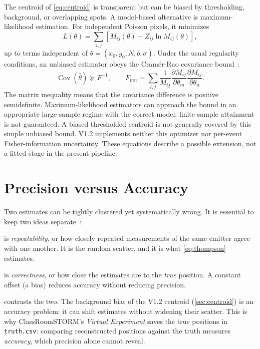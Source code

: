 \documentclass[11pt,a4paper]{article}
\newcommand{\file}[1]{\texttt{#1}}
\newcommand{\app}{ClassRoomSTORM}
\begin{document}
\begin{csideal}
The centroid of \cref{eq:centroid} is transparent but can be biased by
thresholding, background, or overlapping spots. A model-based alternative is
maximum-likelihood estimation. For independent Poisson pixels, it minimizes
\begin{equation}
  L(\theta)=\sum_{i,j}[M_{ij}(\theta)-Z_{ij}\ln M_{ij}(\theta)],
  \label{eq:nll}
\end{equation}
up to terms independent of $\theta=(x_0,y_0,N,b,\sigma)$. Under the usual
regularity conditions, an unbiased estimator obeys the Cram\'er-Rao covariance
bound~\cite{ober2004,mortensen2010}:
\begin{equation}
  \operatorname{Cov}(\hat\theta)\succeq F^{-1},\qquad
  F_{mn}=\sum_{i,j}\frac{1}{M_{ij}}
  \frac{\partial M_{ij}}{\partial\theta_m}
  \frac{\partial M_{ij}}{\partial\theta_n}.
  \label{eq:crlb}
\end{equation}
The matrix inequality means that the covariance difference is positive
semidefinite. Maximum-likelihood estimators can approach the bound in an
appropriate large-sample regime with the correct model; finite-sample
attainment is not guaranteed. A biased thresholded centroid is not generally
covered by this simple unbiased bound. V1.2 implements neither this optimizer
nor per-event Fisher-information uncertainty. These equations describe a
possible extension, not a fitted stage in the present pipeline.
\end{csideal}

\section{Precision versus Accuracy}
\label{sec:precacc}

Two estimates can be tightly clustered yet systematically wrong. It is essential
to keep two ideas separate~\cite{deschout2014}:
\begin{description}[leftmargin=1.6em]
  \item[Precision] is \emph{repeatability}, or how closely repeated measurements
        of the same emitter agree with one another. It is the random scatter,
        and it is what \cref{eq:thompson} estimates.
  \item[Accuracy] is \emph{correctness}, or how close the estimates are to the
        \emph{true} position. A constant offset (a bias) reduces accuracy without reducing precision.
\end{description}
 contrasts the two. The background bias of the V1.2 centroid
(\cref{sec:centroid}) is an accuracy problem: it can shift estimates
without widening their scatter. This is why \app{}'s \emph{Virtual Experiment}
saves the true positions in \file{truth.csv}: comparing reconstructed positions
against the truth measures \emph{accuracy}, which precision alone cannot reveal.
\end{document}
